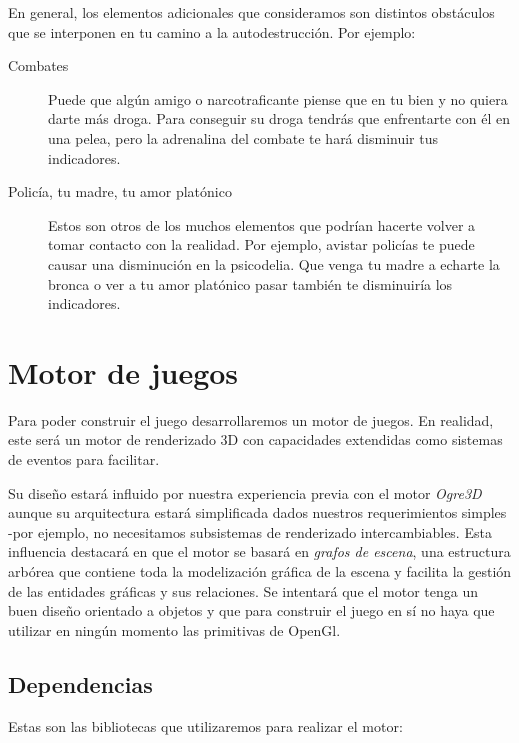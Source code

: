 \documentclass[a4paper,10pt,spanish]{article}
\begin{document}
\begin{description}
En general, los elementos adicionales que consideramos son distintos obstáculos que se interponen en tu camino a la autodestrucción. Por ejemplo:

\begin{description}
\item[Combates] Puede que algún amigo o narcotraficante piense que en tu bien y no quiera darte más droga. Para conseguir su droga tendrás que enfrentarte con él en una pelea, pero la adrenalina del combate te hará disminuir tus indicadores.

\item[Policía, tu madre, tu amor platónico] Estos son otros de los muchos elementos que podrían hacerte volver a tomar contacto con la realidad. Por ejemplo, avistar policías te puede causar una disminución en la psicodelia. Que venga tu madre a echarte la bronca o ver a tu amor platónico pasar también te disminuiría los indicadores.
\end{description}

\section{Motor de juegos}

Para poder construir el juego desarrollaremos un motor de juegos. En realidad, este será un motor de renderizado 3D con capacidades extendidas como sistemas de eventos para facilitar.

Su diseño estará influido por nuestra experiencia previa con el motor \emph{Ogre3D} aunque su arquitectura estará simplificada dados nuestros requerimientos simples -por ejemplo, no necesitamos subsistemas de renderizado intercambiables. Esta influencia destacará en que el motor se basará en \emph{grafos de escena}, una estructura arbórea que contiene toda la modelización gráfica de la escena y facilita la gestión de las entidades gráficas y sus relaciones. Se intentará que el motor tenga un buen diseño orientado a objetos y que para construir el juego en sí no haya que utilizar en ningún momento las primitivas de OpenGl.

\subsection{Dependencias}

Estas son las bibliotecas que utilizaremos para realizar el motor:


\end{description}
\end{document}
